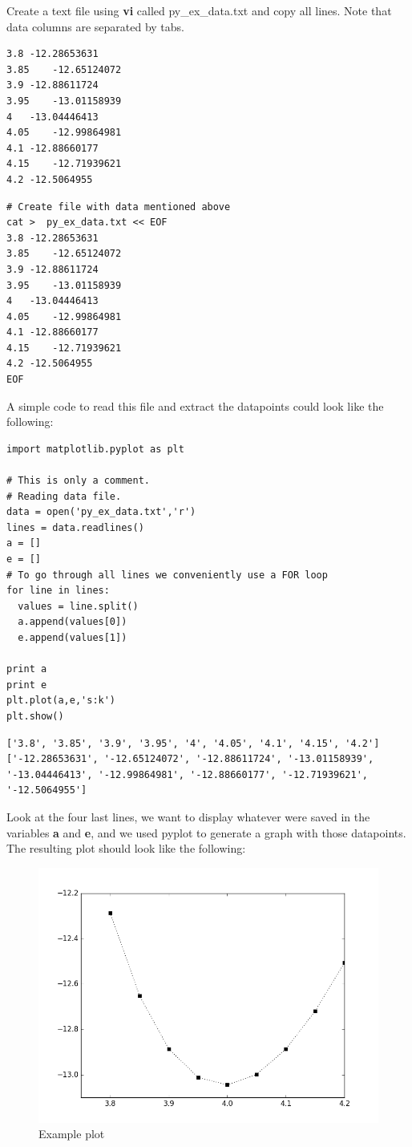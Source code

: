 \documentclass[11pt]{article}
\begin{document}
Create a text file using \textbf{vi} called py\_ex\_data.txt and copy all lines. Note that data columns are separated by tabs. 
\begin{verbatim}
3.8	-12.28653631
3.85	-12.65124072
3.9	-12.88611724
3.95	-13.01158939
4	-13.04446413
4.05	-12.99864981
4.1	-12.88660177
4.15	-12.71939621
4.2	-12.5064955
\end{verbatim}

\begin{verbatim}
# Create file with data mentioned above
cat >  py_ex_data.txt << EOF
3.8	-12.28653631
3.85	-12.65124072
3.9	-12.88611724
3.95	-13.01158939
4	-13.04446413
4.05	-12.99864981
4.1	-12.88660177
4.15	-12.71939621
4.2	-12.5064955
EOF
\end{verbatim}

A simple code to read this file and extract the datapoints could look like the following:
\begin{verbatim}
import matplotlib.pyplot as plt

# This is only a comment. 
# Reading data file.
data = open('py_ex_data.txt','r')
lines = data.readlines()
a = []
e = []
# To go through all lines we conveniently use a FOR loop
for line in lines:
  values = line.split()
  a.append(values[0])
  e.append(values[1])

print a
print e
plt.plot(a,e,'s:k')
plt.show()
\end{verbatim}

\begin{verbatim}
['3.8', '3.85', '3.9', '3.95', '4', '4.05', '4.1', '4.15', '4.2']
['-12.28653631', '-12.65124072', '-12.88611724', '-13.01158939', '-13.04446413', '-12.99864981', '-12.88660177', '-12.71939621', '-12.5064955']
\end{verbatim}

Look at the four last lines, we want to display whatever were saved in the variables \textbf{a} and \textbf{e}, and we used pyplot to generate a graph with those datapoints. The resulting plot should look like the following:

\begin{figure}[htbp]
\centering
\includegraphics[width=.9\linewidth]{./figures/py-ex-data.png}
\caption{Example plot}
\end{figure}
\end{document}
